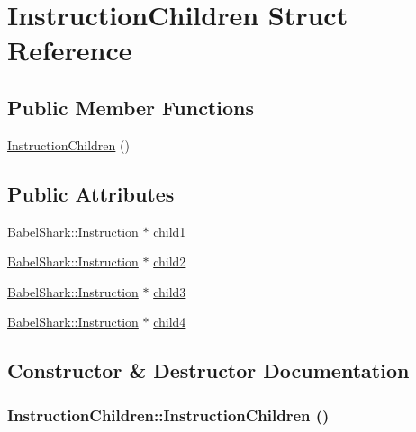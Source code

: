 \hypertarget{struct_instruction_children}{
\section{InstructionChildren Struct Reference}
\label{struct_instruction_children}
}
\subsection*{Public Member Functions}
\begin{CompactItemize}
\item 
\hyperlink{struct_instruction_children_7775982f3d2d8ceb4908333585ab1828}{InstructionChildren} ()
\end{CompactItemize}
\subsection*{Public Attributes}
\begin{CompactItemize}
\item 
\hyperlink{class_babel_shark_1_1_instruction}{BabelShark::Instruction} $\ast$ \hyperlink{struct_instruction_children_987efbbfa2096fb79332d0adeeb75d11}{child1}
\item 
\hyperlink{class_babel_shark_1_1_instruction}{BabelShark::Instruction} $\ast$ \hyperlink{struct_instruction_children_5270f351c7a3f3aaeab9fd1b2f9b0415}{child2}
\item 
\hyperlink{class_babel_shark_1_1_instruction}{BabelShark::Instruction} $\ast$ \hyperlink{struct_instruction_children_372efbfdfb467ea126e947e39620b49b}{child3}
\item 
\hyperlink{class_babel_shark_1_1_instruction}{BabelShark::Instruction} $\ast$ \hyperlink{struct_instruction_children_594e48b823408bfc820d922cc5d18b0d}{child4}
\end{CompactItemize}


\subsection{Constructor \& Destructor Documentation}
\hypertarget{struct_instruction_children_7775982f3d2d8ceb4908333585ab1828}{
\subsubsection[{InstructionChildren}]{\setlength{\rightskip}{0pt plus 5cm}InstructionChildren::InstructionChildren ()}}
\label{struct_instruction_children_7775982f3d2d8ceb4908333585ab1828}




